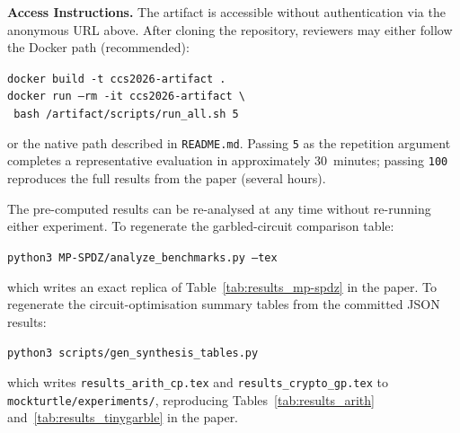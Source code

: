 \begin{enumerate}[leftmargin=*, label=\textbf{A\arabic*.}, itemsep=2pt]
\end{enumerate}

\smallskip
\noindent\textbf{Access Instructions.}
The artifact is accessible without authentication via the anonymous
URL above.  After cloning the repository, reviewers may either follow
the Docker path (recommended):
%
\begin{center}
  \texttt{docker build -t ccs2026-artifact .} \\[2pt]
  \texttt{docker run --rm -it ccs2026-artifact \textbackslash} \\
  \texttt{\hspace{2em} bash /artifact/scripts/run\_all.sh 5}
\end{center}
%
or the native path described in \texttt{README.md}.
Passing \texttt{5} as the repetition argument completes a representative
evaluation in approximately 30~minutes; passing \texttt{100} reproduces
the full results from the paper (several hours).

The pre-computed results can be re-analysed at any time without re-running
either experiment.  To regenerate the garbled-circuit comparison table:
%
\begin{center}
  \texttt{python3 MP-SPDZ/analyze\_benchmarks.py --tex}
\end{center}
%
which writes an exact replica of Table~\ref{tab:results_mp-spdz} in the paper.
To regenerate the circuit-optimisation summary tables from the committed
JSON results:
%
\begin{center}
  \texttt{python3 scripts/gen\_synthesis\_tables.py}
\end{center}
%
which writes \texttt{results\_arith\_cp.tex} and
\texttt{results\_crypto\_gp.tex} to
\texttt{mockturtle/experiments/}, reproducing
Tables~\ref{tab:results_arith} and~\ref{tab:results_tinygarble} in the paper.

